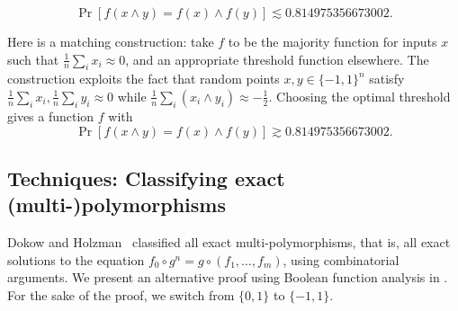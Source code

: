\documentclass{article}
\theoremstyle{definition}
\theoremstyle{remark}
\DeclareMathOperator*{\E}{\mathbb{E}}
\providecommand{\cG}{\mathcal{G}}
\renewcommand\leq{\leqslant}
\begin{document}


\[
 \Pr[f(x \land y) = f(x) \land f(y)] \lesssim 0.814975356673002.
\]

Here is a matching construction: take $f$ to be the majority function for inputs $x$ such that $\frac{1}{n} \sum_i x_i \approx 0$, and an appropriate threshold function elsewhere. The construction exploits the fact that random points $x,y \in \{-1,1\}^n$ satisfy $\frac{1}{n} \sum_i x_i, \frac{1}{n} \sum_i y_i \approx 0$ while $\frac{1}{n} \sum_i (x_i \land y_i) \approx -\frac{1}{2}$. Choosing the optimal threshold gives a function $f$ with
\[
 \Pr[f(x \land y) = f(x) \land f(y)] \gtrsim 0.814975356673002.
\]

\subsection{Techniques: Classifying exact (multi-)polymorphisms}

Dokow and Holzman~\cite{DH09} classified all exact multi-polymorphisms, that is, all exact solutions to the equation $f_0 \circ g^n = g \circ (f_1,\ldots,f_m)$, using combinatorial arguments. We present an alternative proof using Boolean function analysis in . For the sake of the proof, we switch from $\{0,1\}$ to $\{-1,1\}$.
\end{document}
